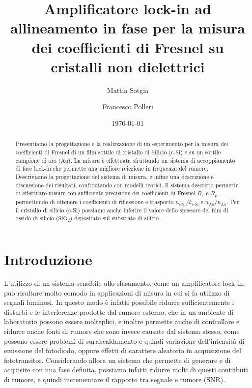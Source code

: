 \documentclass[prb,showpacs,floatfix,altaffilletter,amsmath,amssymb,reprint,citeautoscript]{revtex4-1}
\begin{document}
\title{Amplificatore lock-in ad allineamento in fase per la misura dei coefficienti di Fresnel su cristalli non dielettrici}
\author{Mattia Sotgia}
\author{Francesco Polleri}
\date{\today}

\begin{abstract}
    Presentiamo la progettazione e la realizzazione di un esperimento per la misura dei coefficienti di Fresnel di un film sottile di cristallo di Silicio (c-Si) e su un sottile campione di oro (Au). La misura è effettuata sfruttando un sistema di accoppiamento di fase lock-in\cite{scofieldFrequencydomainDescriptionLockin1994} che permette una migliore reiezione in frequenza del rumore. Descriviamo la progettazione del sistema di misura, e infine una descrizione e discussione dei risultati, confrontando con modelli teorici. Il sistema descritto permette di effettuare misure con sufficiente precisione dei coefficienti di Fresnel $R_s$ e $R_p$, permettendo di ottenere i coefficienti di riflessione e trasporto $n_\text{c-Si}/k_\text{c-Si}$ e $n_\text{Au}/n_\text{Au}$. Per il cristallo di silicio (c-Si) possiamo anche inferire il valore dello spessore del film di ossido di silicio ($\mathrm{SiO_2}$) depositato sul substrato di silicio.
\end{abstract}
\maketitle

\section{Introduzione} 

L'utilizzo di un sistema sensibile allo sfasamento, come un amplificatore lock-in, può risultare molto comodo in applicazioni di misura in cui si fa utilizzo di segnali luminosi. In questo modo è infatti possibile ridurre sufficientemente i disturbi e le interferenze prodotte dal rumore esterno, che in un ambiente di laboratorio possono essere molteplici, e inoltre permette anche di controllare e ridurre anche fonti di rumore che sono invece causate dal sistema stesso, come possono essere problemi di surriscaldamento e quindi variazione dell'intensità di emissione del fotodiodo, oppure effetti di carattere aleatorio in acquisizione del fototransitor. Considerando allora un sistema che permette di generare e di acquisire con una fase definita, possiamo infatti ridurre molti di questi contributi di rumore, e quindi incrementare il rapporto tra segnale e rumore (SNR). 
\end{document}
